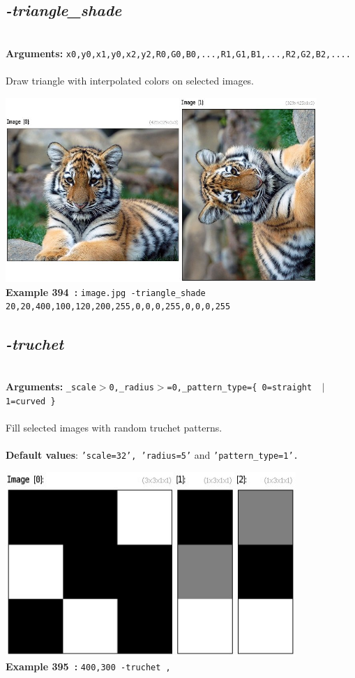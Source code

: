 \documentclass[a4paper,11pt,twoside]{book}
\begin{document}
\subsection{\emph{-triangle\_shade} }\vspace*{-0.5em}
~\\\textbf{Arguments: } 
{\small \texttt{x0,y0,x1,y0,x2,y2,R0,G0,B0,...,R1,G1,B1,...,R2,G2,B2,....}}\\~\\
Draw triangle with interpolated colors on selected images.
\begin{center}\includegraphics[keepaspectratio=true,height=7cm,width=\textwidth]{img/gmic_def394.jpg}\\
{\footnotesize \textbf{Example 394~:} \texttt{image.jpg -triangle\_shade 20,20,400,100,120,200,255,0,0,0,255,0,0,0,255}}
\end{center}

\subsection{\emph{-truchet} }\vspace*{-0.5em}
~\\\textbf{Arguments: } 
{\small \texttt{\_scale$>$0,\_radius$>$=0,\_pattern\_type=\{ 0=straight ~$|$~ 1=curved \}}}\\~\\
Fill selected images with random truchet patterns.
~\\~\\\textbf{Default values}: {\small \texttt{'scale=32', 'radius=5'} and \texttt{'pattern\_type=1'.}}
\begin{center}\includegraphics[keepaspectratio=true,height=7cm,width=\textwidth]{img/gmic_def395.jpg}\\
{\footnotesize \textbf{Example 395~:} \texttt{400,300 -truchet ,}}
\end{center}
\end{document}
